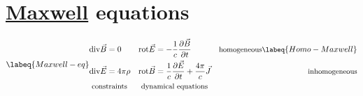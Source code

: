 \documentclass[../main.tex]{subfiles}
\begin{document}
\section[\href{https://it.wikipedia.org/wiki/James_Clerk_Maxwell}{Maxwell} equations]{\href{https://it.wikipedia.org/wiki/James_Clerk_Maxwell}{Maxwell} equations}
\begin{subequations}
\labeq{Maxwell-eq}
\begin{align}
    \text{div}\vec{B} &=0 & \text{rot}\vec{E} &=-\frac{1}{c}\frac{\partial\vec{B}}{\partial t} & \small{\text{homogeneous}}\labeq{Homo-Maxwell}\\
    \text{div}\vec{E} &=4\pi\rho &
    \text{rot}\vec{B} &=\frac{1}{c}\frac{\partial\vec{E}}{\partial t}+\frac{4\pi}{c}\vec{J} & \small{\text{inhomogeneous}}\\
    & \hspace{-1.85em}\small{\text{constraints}} & & \hspace{-1.75em}\small{\text{dynamical equations}}\nonumber
\end{align}
\end{subequations}
\end{document}
